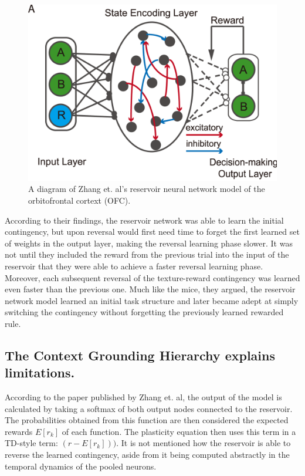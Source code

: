\documentclass[11pt]{article}
\begin{document}
\begin{figure}
	\centering
	\includegraphics[scale=0.25]{./zhang_reservoir_architecture.PNG}
	\caption{A diagram of Zhang et. al's reservoir neural network model of the orbitofrontal cortext (OFC).}
	\label{fig:1a}
\end{figure}

According to their findings, the reservoir network was able to learn the initial contingency, but upon reversal would first need time to forget the first learned set of weights in the output layer, making the reversal learning phase slower.  It was not until they included the reward from the previous trial into the input of the reservoir that they were able to achieve a faster reversal learning phase.  Moreover, each subsequent reversal of the texture-reward contingency was learned even faster than the previous one.  Much like the mice, they argued, the reservoir network model learned an initial task structure and later became adept at simply switching the contingency without forgetting the previously learned rewarded rule.

\subsection{The Context Grounding Hierarchy explains limitations.}
According to the paper published by Zhang et. al, the output of the model is calculated by taking a softmax of both output nodes connected to the reservoir.  The probabilities obtained from this function are then considered the expected rewards $E[r_k]$ of each function.  The plasticity equation  then uses this term in a TD-style term: $(r - E[r_k]))$.  It is not mentioned how the reservoir is able to reverse the learned contingency, aside from it being computed abstractly in the temporal dynamics of the pooled neurons.
\end{document}
